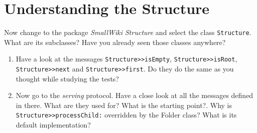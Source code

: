 \section{Understanding the Structure}
\exercise Now change to the package \textit{SmallWiki Structure} and select the class \texttt{Structure}. What are its subclasses? Have you already seen those classes anywhere?
\begin{enumerate}
\item Have a look at the messages \texttt{Structure>>isEmpty},
\texttt{Structure>>isRoot}, \texttt{Structure>>next} and
\texttt{Structure>>first}. Do they do the same as you thought
while studying the tests? \item Now go to the \textit{serving}
protocol. Have a close look at all the messages defined in there.
What are they used for? What is the starting point?. Why is
\texttt{Structure>>processChild:} overridden by the Folder class?
What is its default implementation?
\end{enumerate}

\ifx\wholebook\relax\else\fi
